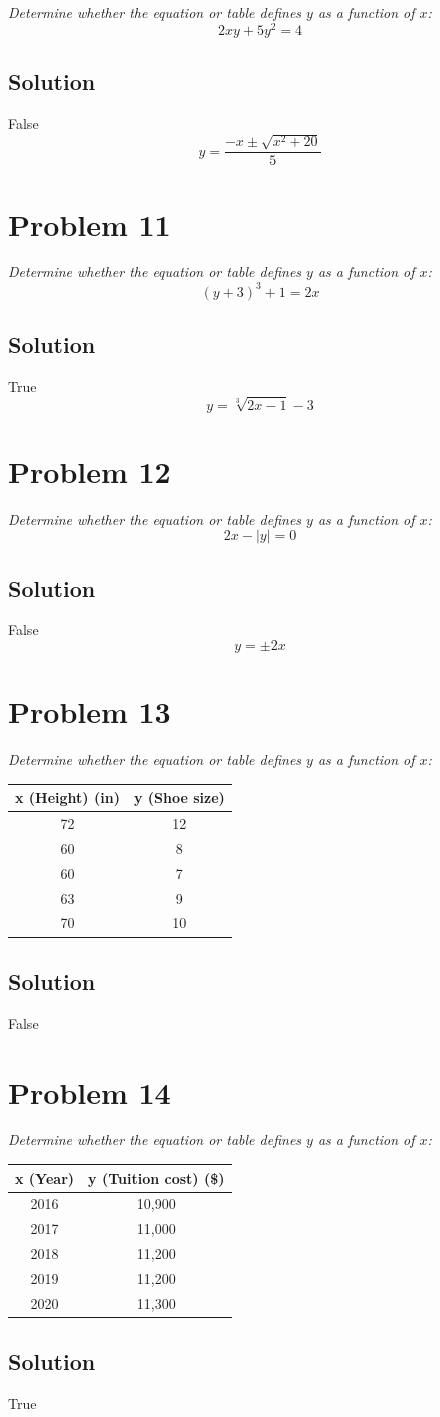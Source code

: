 \documentclass[11pt]{article}
\newcommand{\soln}{\subsection*}
\newcommand{\qn}{\textit}
\begin{document}
\qn{Determine whether the equation or table defines $y$ as a function of $x$: $$2xy+5y^2=4$$}

\soln{Solution}
False
$$y=\frac{-x\pm\sqrt{x^2+20}}{5}$$

\section*{Problem 11}

\qn{Determine whether the equation or table defines $y$ as a function of $x$: $$(y+3)^3+1=2x$$}

\soln{Solution}
True
$$y=\sqrt[3]{2x-1}-3$$

\section*{Problem 12}

\qn{Determine whether the equation or table defines $y$ as a function of $x$: $$2x-|y|=0$$}

\soln{Solution}
False
$$y=\pm2x$$

\section*{Problem 13}

\qn{Determine whether the equation or table defines $y$ as a function of $x$:}

\begin{tabular}{|c|c|}
	\hline
	x (Height) (in) & y (Shoe size) \\
	\hline
	72 & 12 \\
	\hline
	60 & 8 \\
	\hline
	60 & 7 \\
	\hline
	63 & 9 \\
	\hline
	70 & 10 \\
	\hline
\end{tabular}

\soln{Solution}
False

\section*{Problem 14}

\qn{Determine whether the equation or table defines $y$ as a function of $x$:}

\begin{tabular}{|c|c|}
	\hline
	x (Year) & y (Tuition cost) (\$) \\
	\hline
	2016 & 10,900 \\
	\hline
	2017 & 11,000 \\
	\hline
	2018 & 11,200 \\
	\hline
	2019 & 11,200 \\
	\hline
	2020 & 11,300 \\
	\hline
\end{tabular}

\soln{Solution}
True
\end{document}
